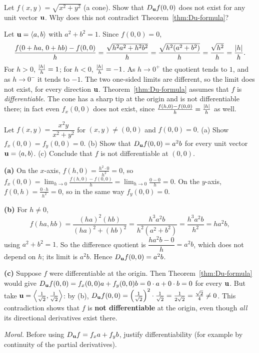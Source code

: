 \begin{problem}[$*$]\label{prob:cone}
Let $f(x,y)=\sqrt{x^2+y^2}$ (a cone). Show that $D_{\mathbf{u}} f(0,0)$ does not exist for
any unit vector $\mathbf{u}$. Why does this not contradict
Theorem~\ref{thm:Du-formula}?
\end{problem}
\begin{solution}
 Let $\mathbf{u}=\left\langle a,b \right\rangle$ with $a^2+b^2=1$. Since $f(0,0)=0$,
\[
  \frac{f(0+ha,\,0+hb)-f(0,0)}{h}=\frac{\sqrt{h^2a^2+h^2b^2}}{h}=\frac{\sqrt{h^2(a^2+b^2)}}{h}=\frac{\sqrt{h^2}}{h}=\frac{\lvert h\rvert}{h}.
\]
 For $h>0$, $\frac{\lvert h\rvert}{h}=1$; for $h<0$, $\frac{\lvert h\rvert}{h}=-1$. As $h\to0^+$
the quotient tends to $1$, and as $h\to0^-$ it tends to $-1$.
 The two one-sided limits are different, so the limit does not exist, for
every direction $\mathbf{u}$.
 Theorem~\ref{thm:Du-formula} assumes that $f$ is \emph{differentiable}.
The cone has a sharp tip at the origin and is not differentiable there; in fact even
$f_x(0,0)$ does not exist, since $\frac{f(h,0)-f(0,0)}{h}=\frac{\lvert h\rvert}{h}$ as well.
\end{solution}

\begin{problem}[$*$]\label{prob:nondiff}
Let $f(x,y)=\dfrac{x^2y}{x^2+y^2}$ for $(x,y)\neq(0,0)$ and $f(0,0)=0$.
(a) Show $f_x(0,0)=f_y(0,0)=0$.
(b) Show that $D_{\mathbf{u}} f(0,0)=a^2b$ for every unit vector $\mathbf{u}=\left\langle a,b \right\rangle$.
(c) Conclude that $f$ is not differentiable at $(0,0)$.
\end{problem}
\begin{solution}
\textbf{(a)} On the $x$-axis, $f(h,0)=\frac{h^2\cdot0}{h^2}=0$, so
$f_x(0,0)=\lim_{h\to0}\frac{f(h,0)-f(0,0)}{h}=\lim_{h\to0}\frac{0-0}{h}=0$. On the $y$-axis,
$f(0,h)=\frac{0\cdot h}{h^2}=0$, so in the same way $f_y(0,0)=0$.

\textbf{(b)} For $h\neq0$,
\[
  f(ha,hb)=\frac{(ha)^2(hb)}{(ha)^2+(hb)^2}=\frac{h^3a^2b}{h^2(a^2+b^2)}=\frac{h^3a^2b}{h^2}=ha^2b,
\]
using $a^2+b^2=1$. So the difference quotient is $\dfrac{ha^2b-0}{h}=a^2b$, which does not depend on
$h$; its limit is $a^2b$. Hence $D_{\mathbf{u}} f(0,0)=a^2b$.

\textbf{(c)} Suppose $f$ were differentiable at the origin. Then Theorem~\ref{thm:Du-formula} would give
$D_{\mathbf{u}} f(0,0)=f_x(0,0)a+f_y(0,0)b=0\cdot a+0\cdot b=0$ for every $\mathbf{u}$. But take
$\mathbf{u}=\left\langle \frac{1}{\sqrt2},\frac{1}{\sqrt2} \right\rangle$: by (b), $D_{\mathbf{u}} f(0,0)=\left(\frac{1}{\sqrt2}\right)^2\cdot\frac{1}{\sqrt2}=\frac{1}{2\sqrt2}=\frac{\sqrt2}{4}\neq0$.
This contradiction shows that $f$ is \textbf{not differentiable} at the origin, even though
\emph{all} its directional derivatives exist there.

\emph{Moral.} Before using $D_{\mathbf{u}} f=f_xa+f_yb$, justify differentiability (for example by
continuity of the partial derivatives).
\end{solution}

